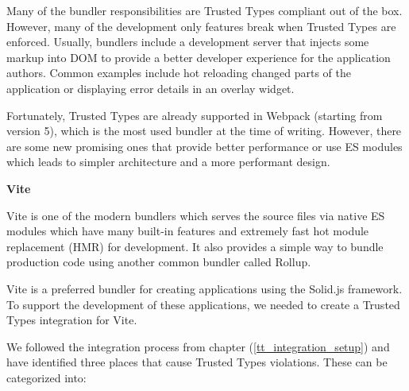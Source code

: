 Many of the bundler responsibilities are Trusted Types compliant out of the box. However, many of
the development only features break when Trusted Types are enforced. Usually, bundlers include a
development server that injects some markup into DOM to provide a better developer experience for
the application authors. Common examples include hot reloading changed parts of the application or
displaying error details in an overlay widget.

Fortunately, Trusted Types are already supported in Webpack (starting from version 5), which is the
most used bundler at the time of writing. However, there are some new promising ones that provide
better performance or use ES modules which leads to simpler architecture and a more performant
design.

\medskip
\begin{flushleft}\textbf {Vite}\end{flushleft}
\medskip

Vite is one of the modern bundlers which serves the source files via native ES modules which have
many built-in features and extremely fast hot module replacement (HMR) for development. It also
provides a simple way to bundle production code using another common bundler called Rollup.

Vite is a preferred bundler for creating applications using the Solid.js framework. To support the
development of these applications, we needed to create a Trusted Types integration for Vite.

We followed the integration process from chapter (\ref{tt_integration_setup}) and have
identified three places that cause Trusted Types violations. These can be categorized into:

